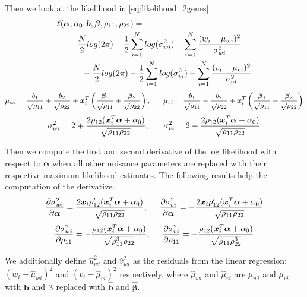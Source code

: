 \documentclass[aap, preprint]{imsart}
\numberwithin{equation}{section}
\theoremstyle{plain}
\begin{document}
Then we look at the likelihood in \ref{eq:likelihood_2genes}.
\begin{equation}
\begin{multlined}
\ell(\bm{\alpha}, \alpha_0, \bm{b}, \bm{\beta}, \rho_{11}, \rho_{22}) = \\
-\frac{N}{2} log(2\pi) - \frac{1}{2} \sum_{i=1}^{N} log (\sigma_{wi}^2) - \sum_{i=1}^{N} \frac{(w_i - \mu_{wi})^2}{\sigma_{wi}^2}\\
\hspace{7mm} -\frac{N}{2} log(2\pi) - \frac{1}{2} \sum_{i=1}^{N} log (\sigma_{vi}^2) - \sum_{i=1}^{N} \frac{(v_i - \mu_{vi})^2}{\sigma_{vi}^2}
\end{multlined}
    \label{eq:likelihood_2genes_appendix}
\end{equation}
$$\mu_{wi} = \frac{{b}_1}{\sqrt{\rho_{11}}} + \frac{{b}_2}{\sqrt{\rho_{22}}} + \bm{x}_i^T \left(\frac{\bm{\beta}_1}{\sqrt{\rho_{11}}} + \frac{\bm{\beta}_2}{\sqrt{\rho_{22}}}\right), \hspace{6mm} 
\mu_{vi} = \frac{{b}_1}{\sqrt{\rho_{11}}} - \frac{{b}_2}{\sqrt{\rho_{22}}} + \bm{x}_i^T \left(\frac{\bm{\beta}_1}{\sqrt{\rho_{11}}} - \frac{\bm{\beta}_2}{\sqrt{\rho_{22}}}\right)$$
$$\sigma_{wi}^2 = 2 + \frac{2\rho_{12}(\bm{x}_i^T\bm{\alpha} + \alpha_0)}{\sqrt{\rho_{11}\rho_{22}}}, \hspace{6mm} \sigma_{vi}^2 = 2 - \frac{2\rho_{12}(\bm{x}_i^T\bm{\alpha} + \alpha_0)}{\sqrt{\rho_{11}\rho_{22}}}$$

Then we compute the first and second derivative of the log likelihood with respect to $\bm{\alpha}$ when all other nuisance parameters are replaced with their respective maximum likelihood estimates. The following results help the computation of the derivative.
$$
\frac{\partial \sigma_{wi}^2}{\partial \bm{\alpha}} = \frac{2\bm{x}_i \rho_{12}'(\bm{x}_i^T \bm{\alpha} + \alpha_0)}{\sqrt{\rho_{11}\rho_{22}}}, \hspace{5mm}
\frac{\partial \sigma_{vi}^2}{\partial \bm{\alpha}} = -\frac{2\bm{x}_i \rho_{12}'(\bm{x}_i^T \bm{\alpha} + \alpha_0)}{\sqrt{\rho_{11}\rho_{22}}}
$$
$$\frac{\partial \sigma_{wi}^2}{\partial \rho_{11}} = -\frac{\rho_{12}(\bm{x}_i^T\bm{\alpha} + \alpha_0)}{\sqrt{\rho_{11}^3\rho_{22}}}, \hspace{5mm}
\frac{\partial \sigma_{vi}^2}{\partial \rho_{11}} = -\frac{\rho_{12}(\bm{x}_i^T\bm{\alpha} + \alpha_0)}{\sqrt{\rho_{11}\rho_{22}^3}}$$

\noindent We additionally define $\hat{u}_{wi}^2$ and $\hat{v}_{wi}^2$ as the residuals from the linear regression: $(w_i - \hat{\mu}_{wi})^2$ and $(v_i-\hat{\mu}_{vi})^2$ respectively, where $\hat{\mu}_{wi}$ and $\hat{\mu}_{vi}$ are $\mu_{wi}$ and $\mu_{vi}$ with $\bm{b}$ and $\bm{\beta}$ replaced with $\hat{\bm{b}}$ and $\hat{\bm{\beta}}$.\\
\end{document}
